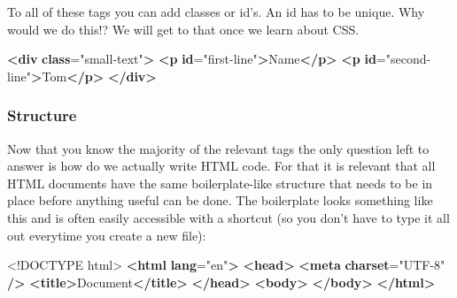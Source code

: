 \documentclass[
]{article}
\newenvironment{Shaded}{\begin{snugshade}}{\end{snugshade}}
\newcommand{\DataTypeTok}[1]{\textcolor[rgb]{0.13,0.29,0.53}{#1}}
\newcommand{\ErrorTok}[1]{\textcolor[rgb]{0.64,0.00,0.00}{\textbf{#1}}}
\newcommand{\KeywordTok}[1]{\textcolor[rgb]{0.13,0.29,0.53}{\textbf{#1}}}
\newcommand{\NormalTok}[1]{#1}
\newcommand{\OtherTok}[1]{\textcolor[rgb]{0.56,0.35,0.01}{#1}}
\newcommand{\StringTok}[1]{\textcolor[rgb]{0.31,0.60,0.02}{#1}}
\begin{document}
To all of these tags you can add classes or id's. An id has to be unique. Why would we do this!? We will get to that once we learn about CSS.

\begin{Shaded}
\begin{Highlighting}[]
\KeywordTok{\textless{}div} \ErrorTok{class}\OtherTok{=}\StringTok{"small{-}text"}\KeywordTok{\textgreater{}}
  \KeywordTok{\textless{}p} \ErrorTok{id}\OtherTok{=}\StringTok{"first{-}line"}\KeywordTok{\textgreater{}}\NormalTok{Name}\KeywordTok{\textless{}/p\textgreater{}}
  \KeywordTok{\textless{}p} \ErrorTok{id}\OtherTok{=}\StringTok{"second{-}line"}\KeywordTok{\textgreater{}}\NormalTok{Tom}\KeywordTok{\textless{}/p\textgreater{}}
\KeywordTok{\textless{}/div\textgreater{}}
\end{Highlighting}
\end{Shaded}

\hypertarget{structure}{%
\subsubsection*{Structure}\label{structure}}

Now that you know the majority of the relevant tags the only question left to answer is how do we actually write HTML code. For that it is relevant that all HTML documents have the same boilerplate-like structure that needs to be in place before anything useful can be done. The boilerplate looks something like this and is often easily accessible with a shortcut (so you don't have to type it all out everytime you create a new file):

\begin{Shaded}
\begin{Highlighting}[]
\DataTypeTok{\textless{}!DOCTYPE }\NormalTok{html}\DataTypeTok{\textgreater{}}
\KeywordTok{\textless{}html} \ErrorTok{lang}\OtherTok{=}\StringTok{"en"}\KeywordTok{\textgreater{}}
  \KeywordTok{\textless{}head\textgreater{}}
    \KeywordTok{\textless{}meta} \ErrorTok{charset}\OtherTok{=}\StringTok{"UTF{-}8"} \KeywordTok{/\textgreater{}}
    \KeywordTok{\textless{}title\textgreater{}}\NormalTok{Document}\KeywordTok{\textless{}/title\textgreater{}}
  \KeywordTok{\textless{}/head\textgreater{}}
  \KeywordTok{\textless{}body\textgreater{}}
  \KeywordTok{\textless{}/body\textgreater{}}
\KeywordTok{\textless{}/html\textgreater{}}
\end{Highlighting}
\end{Shaded}
\end{document}
